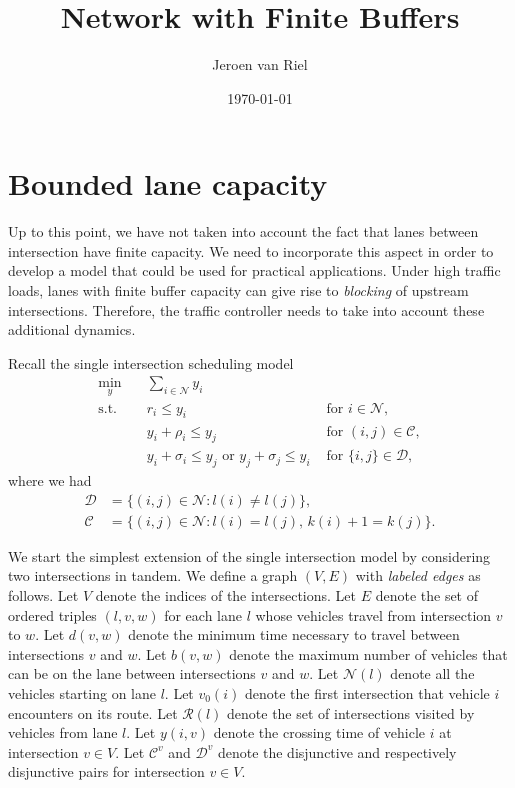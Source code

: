 \documentclass{article}
\title{Network with Finite Buffers}
\author{Jeroen van Riel}
\date{\monthyeardate\today}
\theoremstyle{definition}
\theoremstyle{plain}
\begin{document}
\section*{Bounded lane capacity}

Up to this point, we have not taken into account the fact that lanes between
intersection have finite capacity. We need to incorporate this aspect in order
to develop a model that could be used for practical applications. Under high
traffic loads, lanes with finite buffer capacity can give rise to
\textit{blocking} of upstream intersections. Therefore, the traffic controller
needs to take into account these additional dynamics.


Recall the single intersection scheduling model
\begin{align*}
  \min_{y} \quad & \sum_{i \in \mathcal{N}} y_{i} & \\
  \text{s.t.} \quad & r_{i} \leq y_{i} & \text{ for } i \in \mathcal{N} , \\
  & y_{i} + \rho_{i} \leq y_{j} & \text{ for } (i,j) \in \mathcal{C} , \\
  & y_{i} + \sigma_{i} \leq y_{j} \text{ or } y_{j} + \sigma_{j} \leq y_{i} & \text{ for } \{i,j\} \in \mathcal{D} ,
\end{align*}
where we had
\begin{align*}
  \mathcal{D} &= \{ (i,j) \in \mathcal{N} : l(i) \neq l(j) \} , \\
  \mathcal{C} &= \{ (i,j) \in \mathcal{N} : l(i) = l(j) , \, k(i) + 1 = k(j) \} .
\end{align*}

We start the simplest extension of the single intersection model by considering
two intersections in tandem.
%
We define a graph $(V,E)$ with \textit{labeled edges} as follows.
Let $V$ denote the indices of the intersections.
Let $E$ denote the set of ordered triples $(l, v, w)$ for each lane $l$ whose
vehicles travel from intersection $v$ to $w$.
%
Let $d(v, w)$ denote the minimum time necessary to travel between intersections $v$ and $w$.
Let $b(v, w)$ denote the maximum number of vehicles that can be on the lane between intersections $v$ and $w$.
Let $\mathcal{N}(l)$ denote all the vehicles starting on lane $l$.
Let $v_{0}(i)$ denote the first intersection that vehicle $i$ encounters on its route.
Let $\mathcal{R}(l)$ denote the set of intersections visited by vehicles from lane $l$.
Let $y(i,v)$ denote the crossing time of vehicle $i$ at intersection $v \in V$.
Let $\mathcal{C}^{v}$ and $\mathcal{D}^{v}$ denote the disjunctive and respectively disjunctive pairs for intersection $v \in V$.
\end{document}
